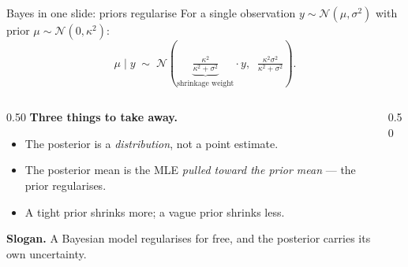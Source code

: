 \documentclass[10pt,aspectratio=169]{beamer}
\newcommand{\N}{\mathcal{N}}
\begin{document}
\begin{frame}{Bayes in one slide: priors regularise}
For a single observation $y \sim \N(\mu, \sigma^2)$ with prior $\mu \sim \N(0, \kappa^2)$:
\[
\mu \mid y \;\sim\; \N\!\left(\underbrace{\tfrac{\kappa^2}{\kappa^2+\sigma^2}}_{\text{shrinkage weight}}\!\cdot y,\;\;\tfrac{\kappa^2\sigma^2}{\kappa^2+\sigma^2}\right).
\]

\begin{columns}[T,onlytextwidth]
\begin{column}{0.50\textwidth}
\medskip
\textbf{Three things to take away.}
\begin{itemize}
  \item The posterior is a \emph{distribution}, not a point estimate.
  \item The posterior mean is the MLE \emph{pulled toward the prior mean} — the prior \alert{regularises}.
  \item A tight prior shrinks more; a vague prior shrinks less.
\end{itemize}

\bigskip

\textbf{Slogan.} A Bayesian model regularises for free, and the posterior carries its own uncertainty.
\end{column}
\begin{column}{0.50\textwidth}
\centering
{}
\end{column}
\end{columns}
\end{frame}
\end{document}
